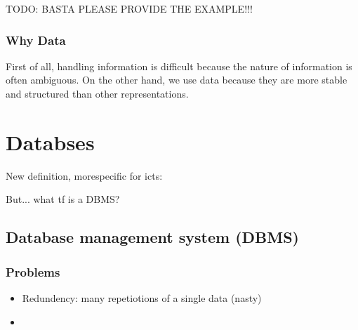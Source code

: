 TODO: BASTA PLEASE PROVIDE THE EXAMPLE!!! 

\subsubsection{Why Data}
First of all, handling information is difficult because the nature of information is often ambiguous. On the other hand, we use data because they are more stable and structured than other representations.

\section{Databses}
New definition, morespecific for icts:

But... what tf is a DBMS? {\emojifont 🥀}

\subsection{Database management system (DBMS)}

\subsubsection{Problems}
\begin{itemize}
    \item Redundency: many repetiotions of a single data (nasty)
    \item 
\end{itemize}



